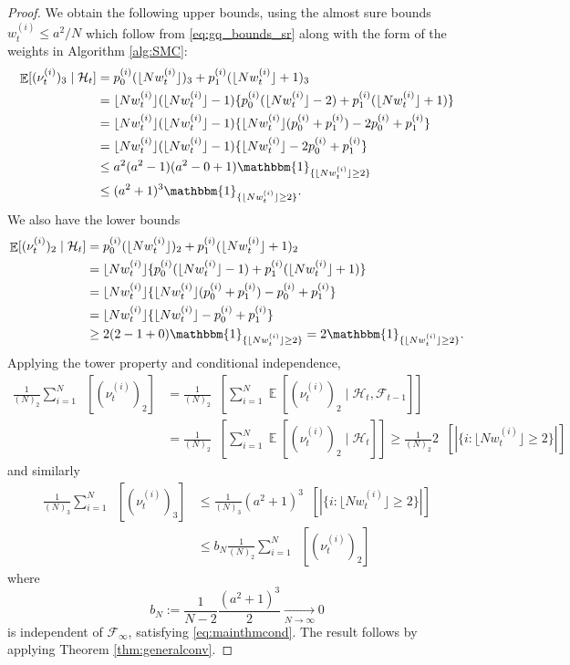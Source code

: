 \documentclass{article} %
\theoremstyle{definition}
\DeclareMathOperator{\E}{\mathbb{E}}
\DeclareMathOperator{\Et}{\mathbb{E}_t}
\newcommand{\flnw}{\lfloor N w_t^{(i)} \rfloor}
\newcommand{\1}[1]{\mathbbm{1}_{\{#1\}}}
\begin{document}
\begin{proof}
We obtain the following upper bounds, using the almost sure bounds $w_t^{(i)} \leq a^2/N$ which follow from \eqref{eq:gq_bounds_sr} along with the form of the weights in Algorithm \ref{alg:SMC}:
\begin{align*}
\E[(\nu_t^{(i)})_3 \mid \mathcal{H}_t] &= p_0^{(i)} (\flnw)_3 + p_1^{(i)} (\flnw + 1)_3 \\
&= \flnw (\flnw -1) \{ p_0^{(i)} (\flnw -2) + p_1^{(i)} (\flnw +1) \} \\
&= \flnw (\flnw -1) \{ \flnw (p_0^{(i)} + p_1^{(i)}) -2 p_0^{(i)} + p_1^{(i)} \} \\
&= \flnw (\flnw -1) \{ \flnw -2 p_0^{(i)} + p_1^{(i)} \} \\
&\leq a^2 (a^2 -1) (a^2 -0 +1) \1{\flnw \geq 2} \\
&\leq (a^2 +1)^3 \1{\flnw \geq 2} .
\end{align*}
We also have the lower bounds
\begin{align*}
\E[(\nu_t^{(i)})_2 \mid \mathcal{H}_t] &= p_0^{(i)} (\flnw)_2 + p_1^{(i)} (\flnw + 1)_2 \\
&= \flnw \{ p_0^{(i)} (\flnw -1) + p_1^{(i)} (\flnw +1) \} \\
&= \flnw \{ \flnw (p_0^{(i)} + p_1^{(i)}) - p_0^{(i)} + p_1^{(i)} \} \\
&= \flnw \{ \flnw - p_0^{(i)} + p_1^{(i)} \} \\
&\geq 2 (2 -1 +0) \1{\flnw \geq 2} = 2 \1{\flnw \geq 2} .
\end{align*}
Applying the tower property and conditional independence,
\begin{align*}
\frac{1}{(N)_2} \sum_{i=1}^N \Et [( \nu_t^{(i)} )_2 ] 
&= \frac{1}{(N)_2} \Et\left[ \sum_{i=1}^N \E\left[ (\nu_t^{(i)})_2 \mid \mathcal{H}_t, \mathcal{F}_{t-1} \right] \right] \\
&= \frac{1}{(N)_2} \Et\left[ \sum_{i=1}^N \E\left[ (\nu_t^{(i)})_2 \mid \mathcal{H}_t \right] \right]
\geq \frac{1}{(N)_2} 2 \Et\left[ |\{i:\flnw\geq 2\}| \right] 
\end{align*}
and similarly
\begin{align*}
\frac{1}{(N)_3} \sum_{i=1}^N \Et [( \nu_t^{(i)} )_3 ] 
&\leq \frac{1}{(N)_3}  (a^2+1)^3 \Et\left[ |\{i:\flnw\geq 2\}| \right] \\
&\leq b_N  \frac{1}{(N)_2} \sum_{i=1}^N \Et [( \nu_t^{(i)} )_2 ]
\end{align*}
where
\begin{equation*}
b_N := \frac{1}{N-2}\frac{(a^2+1)^3}{2} \underset{N\to\infty}{\longrightarrow} 0
\end{equation*}
is independent of $\mathcal{F}_\infty$, satisfying \eqref{eq:mainthmcond}.
The result follows by applying Theorem \ref{thm:generalconv}.
\end{proof}
\end{document}

